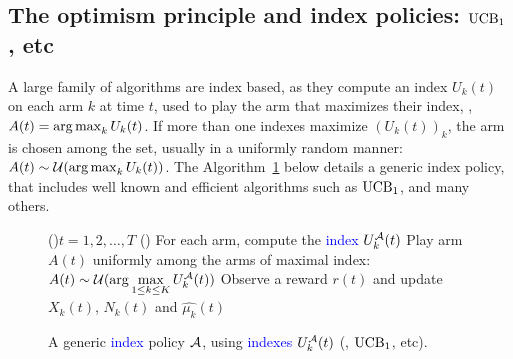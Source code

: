 \subsection{The optimism principle and index policies: $\UCB_1$, \klUCB{} etc}
\label{sub:2:IndexPolicies}

A large family of algorithms are index based, as they compute an index $U_k(t)$ on each arm $k$ at time $t$,
used to play the arm that maximizes their index, \ie, $A(t) = \operatorname*{arg\,max}_k U_k(t)$.
If more than one indexes maximize $(U_k(t))_k$, the arm is chosen among the set, usually in a uniformly random manner: $A(t) \sim \mathcal{U}(\operatorname*{arg\,max}_k U_k(t))$.
%
The Algorithm~\ref{algo:2:indexPolicy} below details a generic index policy, that includes well known and efficient algorithms such as $\UCB_1$, \klUCB{} and many others.

\begin{figure}[h!]
	\centering
    \begin{framed}
	\begin{algorithm}[H]
		\For(){$t = 1, 2, \dots, T$}{
			\uElse(){
                For each arm, compute the \textcolor{blue}{index $U_k^{\mathcal{A}}(t)$}\;
                Play arm $A(t)$ uniformly among the arms of maximal index: \textcolor{blue}{$A(t) \sim \mathcal{U}(\arg\max\limits_{1\leq k \leq K} U_k^{\mathcal{A}}(t))$}\;
            }
            Observe a reward $r(t)$ and update $X_k(t)$, $N_k(t)$ and $\widehat{\mu_k}(t)$\;
		}
		\caption[{A generic index policy $\cA$, using indexes $U_k(t)$ (\eg, $\UCB_1$, \klUCB{} etc).}]{A generic \textcolor{blue}{index} policy $\cA$, using \textcolor{blue}{indexes $U_k^{\mathcal{A}}(t)$} (\eg, $\UCB_1$, \klUCB{} etc).}
		\label{algo:2:indexPolicy}
	\end{algorithm}
	\end{framed}
\end{figure}


